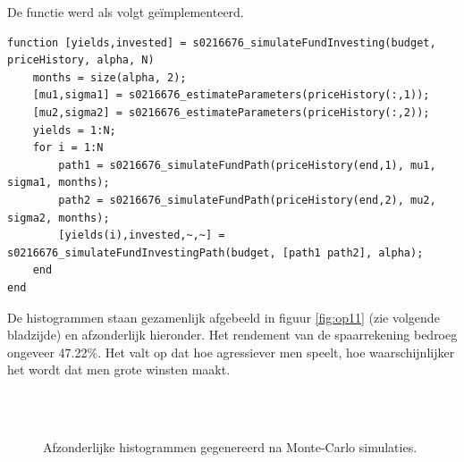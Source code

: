 \vspace*{\fill}

\restoregeometry



De functie werd als volgt ge\"implementeerd.

\begin{lstlisting}
function [yields,invested] = s0216676_simulateFundInvesting(budget, priceHistory, alpha, N)
    months = size(alpha, 2);
    [mu1,sigma1] = s0216676_estimateParameters(priceHistory(:,1));
    [mu2,sigma2] = s0216676_estimateParameters(priceHistory(:,2));
    yields = 1:N;
    for i = 1:N
        path1 = s0216676_simulateFundPath(priceHistory(end,1), mu1, sigma1, months);
        path2 = s0216676_simulateFundPath(priceHistory(end,2), mu2, sigma2, months);
        [yields(i),invested,~,~] = s0216676_simulateFundInvestingPath(budget, [path1 path2], alpha);
    end
end
\end{lstlisting}



De histogrammen staan gezamenlijk afgebeeld in figuur \ref{fig:op11} (zie volgende bladzijde) en afzonderlijk hieronder. Het rendement van de spaarrekening bedroeg ongeveer 47.22\%. Het valt op dat hoe agressiever men speelt, hoe waarschijnlijker het wordt dat men grote winsten maakt.

\begin{figure}[h]
\centering
{}\\
\\
\caption{Afzonderlijke histogrammen gegenereerd na Monte-Carlo simulaties.}%
\label{fig:op11sep}
\end{figure}

